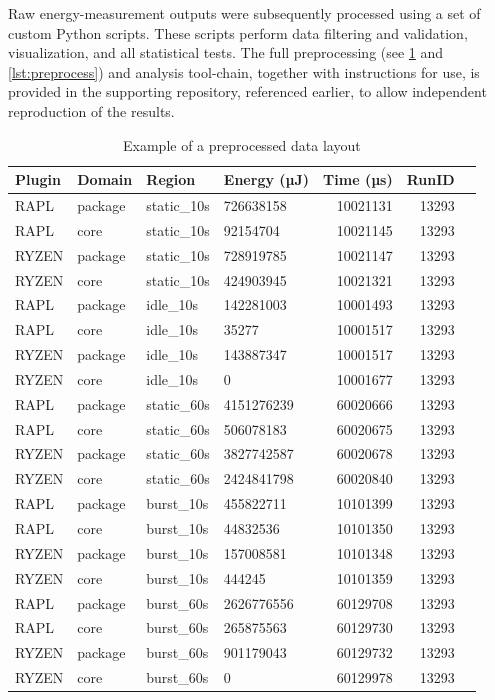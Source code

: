 Raw energy-measurement outputs were subsequently processed using a set of
custom Python scripts. These scripts perform data filtering and validation,
visualization, and all statistical tests. The full preprocessing
(see \cref{tab:preprocessed} and \cref{lst:preprocess}) and analysis
tool-chain, together with instructions for use, is provided in the supporting
repository, referenced earlier, to allow independent reproduction of the
results.

\begin{table}[h]
\centering
\caption{Example of a preprocessed data layout}
\label{tab:preprocessed}
\begin{tabular}{llllrrr}
\hline
Plugin & Domain & Region & Energy (µJ) & Time (µs) & RunID \\
\hline
RAPL  & package & static\_10s & 726638158  & 10021131 & 13293 \\
RAPL  & core    & static\_10s &  92154704  & 10021145 & 13293 \\
RYZEN & package & static\_10s & 728919785  & 10021147 & 13293 \\
RYZEN & core    & static\_10s & 424903945  & 10021321 & 13293 \\
RAPL  & package & idle\_10s   & 142281003  & 10001493 & 13293 \\
RAPL  & core    & idle\_10s   &     35277  & 10001517 & 13293 \\
RYZEN & package & idle\_10s   & 143887347  & 10001517 & 13293 \\
RYZEN & core    & idle\_10s   &         0  & 10001677 & 13293 \\
RAPL  & package & static\_60s & 4151276239 & 60020666 & 13293 \\
RAPL  & core    & static\_60s &  506078183 & 60020675 & 13293 \\
RYZEN & package & static\_60s & 3827742587 & 60020678 & 13293 \\
RYZEN & core    & static\_60s & 2424841798 & 60020840 & 13293 \\
RAPL  & package & burst\_10s  & 455822711  & 10101399 & 13293 \\
RAPL  & core    & burst\_10s  &  44832536  & 10101350 & 13293 \\
RYZEN & package & burst\_10s  & 157008581  & 10101348 & 13293 \\
RYZEN & core    & burst\_10s  &    444245  & 10101359 & 13293 \\
RAPL  & package & burst\_60s  & 2626776556 & 60129708 & 13293 \\
RAPL  & core    & burst\_60s  &  265875563 & 60129730 & 13293 \\
RYZEN & package & burst\_60s  &  901179043 & 60129732 & 13293 \\
RYZEN & core    & burst\_60s  &         0  & 60129978 & 13293 \\
\hline
\end{tabular}
\end{table}

